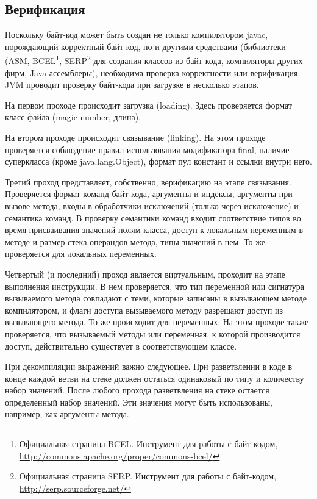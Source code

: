 \documentclass[14pt]{extarticle}
\begin{document}
\subsection{Верификация}
Поскольку байт-код может быть создан не только компилятором javac, порождающий корректный байт-код, но и   другими средствами (библиотеки (ASM, BCEL\footnote{Официальная страница BCEL. Инструмент для работы с байт-кодом, \url{http://commons.apache.org/proper/commons-bcel/}}, SERP\footnote{Официальная страница SERP. Инструмент для работы с байт-кодом, \url{http://serp.sourceforge.net/}} для создания классов из байт-кода, компиляторы других фирм, Java-ассемблеры), необходима проверка корректности или верификация. JVM проводит проверку байт-кода при загрузке в несколько этапов. 

На первом проходе происходит загрузка (loading). Здесь проверяется формат класс-файла (magic number, длина).

На втором проходе происходит связывание (linking). На этом проходе проверяется соблюдение правил использования модификатора final, наличие суперкласса (кроме java.lang.Object), формат пул констант и ссылки внутри него.

Третий проход представляет, собственно, верификацию на этапе связывания. Проверяется формат команд байт-кода, аргументы и индексы, аргументы при вызове метода, входы в обработчики исключений (только через исключение) и семантика команд. В проверку семантики команд входит соответствие типов во время присваивания значений полям класса, доступ к локальным переменным в методе и размер стека операндов метода, типы значений в нем. То же проверяется для локальных переменных.

Четвертый (и последний) проход является виртуальным, проходит на этапе выполнения инструкции. В нем проверяется, что тип переменной или сигнатура вызываемого метода совпадают с теми, которые записаны в вызывающем методе компилятором, и флаги доступа вызываемого методу разрешают доступ из вызывающего метода. То же происходит для переменных. На этом проходе также проверяется, что вызываемый методы или переменная, к которой производится доступ, действительно существует в соответствующем классе.

При декомпиляции выражений важно следующее. При разветвлении в коде в конце каждой ветви на стеке должен остаться одинаковый по типу и количеству набор значений. После любого прохода разветвления на стеке остается определенный набор значений. Эти значения могут быть использованы, например, как аргументы метода.
\end{document}
